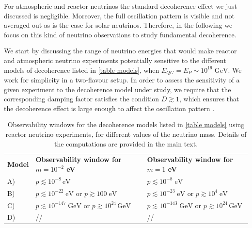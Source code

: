 \documentclass[11pt]{article}
\begin{document}
For atmospheric and reactor neutrinos the standard decoherence effect we just discussed is negligible. Moreover, the full oscillation pattern is visible and not averaged out as is the case for solar neutrinos. Therefore, in the following we focus on this kind of neutrino observations to study fundamental decoherence. 

We start by discussing the range of neutrino energies that would make reactor and atmospheric neutrino experiments potentially sensitive to the different models of decoherence listed in \cref{table models}, when $E_{QG}=E_P\sim 10^{19}\;\text{GeV}$. We work for simplicity in a two-flavour setup. In order to assess the sensitivity of a given experiment to the decoherence model under study, we require that the corresponding damping factor satisfies the condition $D\gtrsim 1$, which ensures that the decoherence effect is large enough to affect the oscillation pattern \cite{Christian:2005qa}.


\begin{table}
    \centering
{\tabulinesep=1.2mm
        \begin{tabu}{|l|l|l|}
       {\small\bf{Model}} & {\footnotesize \bf{Observability window for $m=10^{-2}$ eV}} &{\footnotesize \bf{Observability window for $m=1$ eV}} \\ 
       {\small  A)} & $p\lesssim 10^{-8}\,\text{eV}$ & $p\lesssim 10^{-8}\; \text{eV}$\\ 
           {\small  B)} &  $p\lesssim 10^{-22}\;\text{eV}$ or $p \gtrsim 100 \; \text{eV}$ & $p\lesssim 10^{-23}\;\text{eV}$ or $p \gtrsim 10^4 \; \text{eV}$\\ 
        {\small  C)} & $p\lesssim 10^{-147}\;\text{GeV}$ or $p\gtrsim 10^{24}\,\text{GeV}$ & $p\lesssim 10^{-143}\;\text{GeV}$ or $p\gtrsim 10^{24}\,\text{GeV}$\\ 
        {\small  D)} &  // & // \\  
        \end{tabu}}
    \caption{Observability windows for the decoherence models listed in \cref{table models} using reactor neutrino experiments, for different values of the neutrino mass. Details of the computations are provided in the main text.}
    \label{table results}
\end{table}
\end{document}
